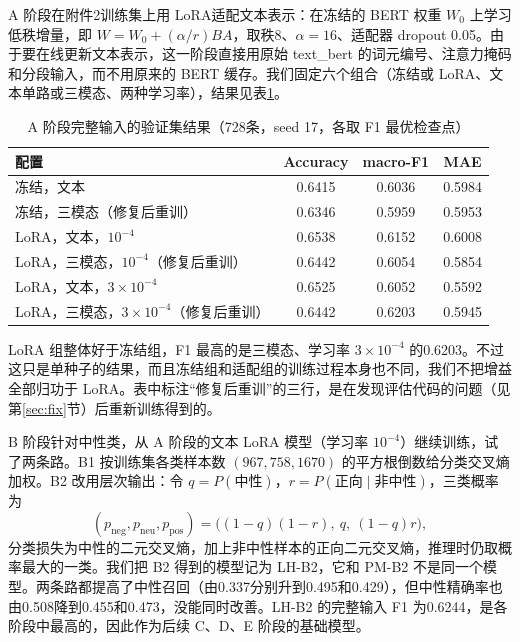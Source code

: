 A 阶段在附件2训练集上用 LoRA\cite{hu2022lora}适配文本表示：在冻结的 BERT 权重 $W_0$ 上学习低秩增量，即 $W=W_0+(\alpha/r)BA$，取秩8、$\alpha=16$、适配器 dropout 0.05。由于要在线更新文本表示，这一阶段直接用原始 text\_bert 的词元编号、注意力掩码和分段输入，而不用原来的 BERT 缓存。我们固定六个组合（冻结或 LoRA、文本单路或三模态、两种学习率），结果见表\ref{tab:stageA}。

\begin{table}[htbp]
\centering
\caption{A 阶段完整输入的验证集结果（728条，seed 17，各取 F1 最优检查点）}
\label{tab:stageA}
\begin{tabular}{lccc}
\toprule
配置 & Accuracy & macro-F1 & MAE \\
\midrule
冻结，文本 & 0.6415 & 0.6036 & 0.5984 \\
冻结，三模态（修复后重训） & 0.6346 & 0.5959 & 0.5953 \\
LoRA，文本，$10^{-4}$ & 0.6538 & 0.6152 & 0.6008 \\
LoRA，三模态，$10^{-4}$（修复后重训） & 0.6442 & 0.6054 & 0.5854 \\
LoRA，文本，$3\times10^{-4}$ & 0.6525 & 0.6052 & 0.5592 \\
LoRA，三模态，$3\times10^{-4}$（修复后重训） & 0.6442 & 0.6203 & 0.5945 \\
\bottomrule
\end{tabular}
\end{table}

LoRA 组整体好于冻结组，F1 最高的是三模态、学习率 $3\times10^{-4}$ 的0.6203。不过这只是单种子的结果，而且冻结组和适配组的训练过程本身也不同，我们不把增益全部归功于 LoRA。表中标注“修复后重训”的三行，是在发现评估代码的问题（见第\ref{sec:fix}节）后重新训练得到的。

B 阶段针对中性类，从 A 阶段的文本 LoRA 模型（学习率 $10^{-4}$）继续训练，试了两条路。B1 按训练集各类样本数 $(967,758,1670)$ 的平方根倒数给分类交叉熵加权。B2 改用层次输出：令 $q=P(\text{中性})$，$r=P(\text{正向}\mid\text{非中性})$，三类概率为
\begin{equation}\label{eq:hier}
(p_{\mathrm{neg}},p_{\mathrm{neu}},p_{\mathrm{pos}})=\big((1-q)(1-r),\ q,\ (1-q)r\big),
\end{equation}
分类损失为中性的二元交叉熵，加上非中性样本的正向二元交叉熵，推理时仍取概率最大的一类。我们把 B2 得到的模型记为 LH-B2，它和 PM-B2 不是同一个模型。两条路都提高了中性召回（由0.337分别升到0.495和0.429），但中性精确率也由0.508降到0.455和0.473，没能同时改善。LH-B2 的完整输入 F1 为0.6244，是各阶段中最高的，因此作为后续 C、D、E 阶段的基础模型。

